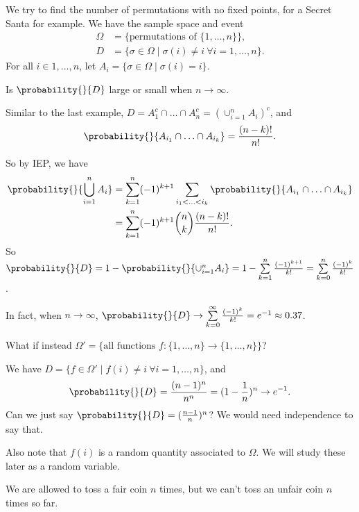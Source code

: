 \newcommand\independent{\protect\mathpalette{\protect\independenT}{\perp}}
\def\independenT#1#2{\mathrel{\rlap{$#1#2$}\mkern2mu{#1#2}}}
\begin{example}[Derangements]
    We try to find the number of permutations with no fixed points, for a Secret Santa for example.
    We have the sample space and event
    \begin{align*}
        \Omega &= \{\text{permutations of } \{1, \ldots, n\}\},\\
        D &= \{\sigma\in \Omega\mid \sigma(i) \neq i ~\forall i = 1, \ldots, n\}.
    \end{align*}
    For all \(i \in {1, \ldots, n}\), let \(A_i = \{\sigma\in \Omega\mid \sigma(i) = i\}\).
    \begin{problem}
        Is \(\probability{}{D} \) large or small when \(n \to \infty\).
    \end{problem}

    Similar to the last example, \(D = A_1^c \cap \ldots\cap A_n^c = (\cup_{i=1}^n A_i)^c\), and
    \[
        \probability{}{A_{i_1}\cap \ldots \cap A_{i_k}}=\frac{(n-k)!}{n!} .
    \]

    So by IEP, we have
    \begin{align*}
        \probability{}{\bigcup_{i=1}^n A_i} &= \sum\limits_{k=1}^{n} (-1)^{k+1} \sum\limits_{i_1 < \ldots <i_k}\probability{}{A_{i_1}\cap \ldots \cap A_{i_k}} \\
        &= \sum\limits_{k=1}^{n} (-1)^{k+1}\binom{n}{k}\frac{(n-k)!}{n!}.
    \end{align*}
    So \(\probability{}{D} = 1 - \probability{}{\cup_{i=1}^n A_i}= 1 - \sum\limits_{k=1}^{n} \frac{(-1)^{k+1}}{k!} = \sum\limits_{k=0}^{n} \frac{(-1)^k}{k!}\).

    In fact, when \(n \to \infty\), \(\probability{}{D} \to \sum\limits_{k=0}^{\infty} \frac{(-1)^k}{k!}=e^{-1}\approx 0.37\).
\end{example}
\begin{note}
    What if instead \(\Omega' = \{\text{all functions } f : \{1, \ldots, n\}\to \{1, \ldots, n\}\}\)?

    We have \(D = \{f \in \Omega' \mid f(i) \neq i ~\forall i = 1, \ldots, n\}\), and
    \[
        \probability{}{D} = \frac{(n-1)^n}{n^n} = (1-\frac{1}{n})^n \to e^{-1}.
    \]
    Can we just say \(\probability{}{D}=(\frac{n-1}{n})^n\)? We would need independence to say that.

    Also note that \(f(i)\) is a random quantity associated to \(\Omega\). We will study these later as a random variable.

    We are allowed to toss a fair coin \(n\) times, but we can't toss an unfair coin \(n\) times so far.
\end{note}
